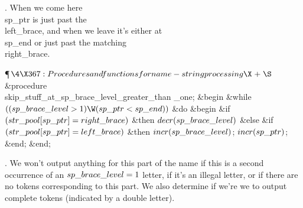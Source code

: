 .
When we come here \\{sp\_ptr} is just past the \\{left\_brace}, and when we
leave it's either at \\{sp\_end} or just past the matching \\{right\_brace}.

\Y\P$\4\X367:Procedures and functions for name-string processing\X\mathrel{+}%
\S$\6
\4\&{procedure}\1\  \\{skip\_stuff\_at\_sp\_brace\_level\_greater\_than%
\_one};\2\6
\&{begin} \&{while} $((\\{sp\_brace\_level}>1)\W(\\{sp\_ptr}<\\{sp\_end}))$ %
\1\&{do}\6
\&{begin} \&{if} $(\\{str\_pool}[\\{sp\_ptr}]=\\{right\_brace})$ \1\&{then}\5
$\\{decr}(\\{sp\_brace\_level})$\6
\4\&{else} \&{if} $(\\{str\_pool}[\\{sp\_ptr}]=\\{left\_brace})$ \1\&{then}\5
$\\{incr}(\\{sp\_brace\_level})$;\2\2\6
$\\{incr}(\\{sp\_ptr})$;\6
\&{end};\2\6
\&{end};\par
\fi

.
We won't output anything for this part of the name if this is a second
occurrence of an $\\{sp\_brace\_level}=1$ letter, if it's an illegal
letter, or if there are no tokens corresponding to this part.  We also
determine if we're we to output complete tokens (indicated by a double
letter).

